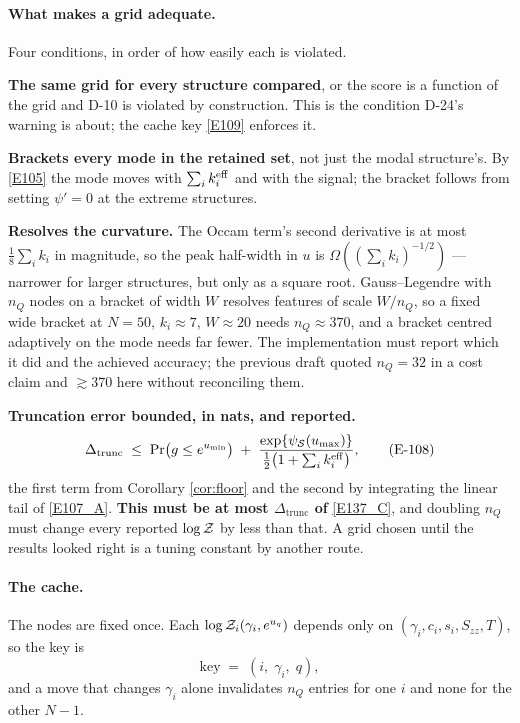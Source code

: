 \paragraph{What makes a grid adequate.} Four conditions, in order of how easily each
is violated.
\begin{description}[leftmargin=2.5em, labelindent=0pt, topsep=0pt, itemsep=0pt,
  font=\normalfont]
\item[(Q1)] \textbf{The same grid for every structure compared}, or the score is a
  function of the grid and D-10 is violated by construction. This is the condition
  D-24's warning is about; the cache key \eqref{E109} enforces it.
\item[(Q2)] \textbf{Brackets every mode in the retained set}, not just the modal
  structure's. By \eqref{E105} the mode moves with $\sum_ik_i^{\mathrm{eff}}$ and with the
  signal; the bracket follows from setting $\psi'=0$ at the extreme structures.
\item[(Q3)] \textbf{Resolves the curvature.} The Occam term's second derivative is
  at most $\frac18\sum_ik_i$ in magnitude, so the peak half-width in $u$ is
  $\Omega((\sum_ik_i)^{-1/2})$ --- narrower for larger structures, but only as a
  square root. Gauss--Legendre with $n_Q$ nodes on a bracket of width $W$ resolves
  features of scale $W/n_Q$, so a fixed wide bracket at $N=50$, $k_i\approx7$,
  $W\approx20$ needs $n_Q\approx370$, and a bracket centred adaptively on the mode
  needs far fewer. The implementation must report which it did and the achieved
  accuracy; the previous draft quoted $n_Q=32$ in a cost claim and $\gtrsim370$ here
  without reconciling them.
\item[(Q4)] \textbf{Truncation error bounded, in nats, and reported.}
\begin{equation}
\Delta_{\text{trunc}} \;\le\; \Pr\bigl(g\le e^{u_{\min}}\bigr) \;+\;
\frac{\exp\{\psi_{\mathcal{S}}(u_{\max})\}}{\frac12\bigl(1+\sum_ik_i^{\mathrm{eff}}\bigr)},
\tag{E-108}\label{E108}
\end{equation}
  the first term from Corollary \ref{cor:floor} and the second by integrating the
  linear tail of \eqref{E107_A}. \textbf{This must be at most $\Delta_{\text{trunc}}$
  of} \eqref{E137_C}, and doubling $n_Q$ must change every reported $\log\mathcal{Z}$ by less
  than that. A grid chosen until the results looked right is a tuning constant by
  another route.
\end{description}

\paragraph{The cache.} The nodes are fixed once. Each $\log\mathcal{Z}_i(\gamma_i,e^{u_q})$
depends only on $(\gamma_i,c_i,s_i,S_{zz},T)$, so the key is
\begin{equation}
\text{key} \;=\; (i,\;\gamma_i,\;q),
\tag{E-109}\label{E109}
\end{equation}
and a move that changes $\gamma_i$ alone invalidates $n_Q$ entries for one $i$ and
none for the other $N-1$.


